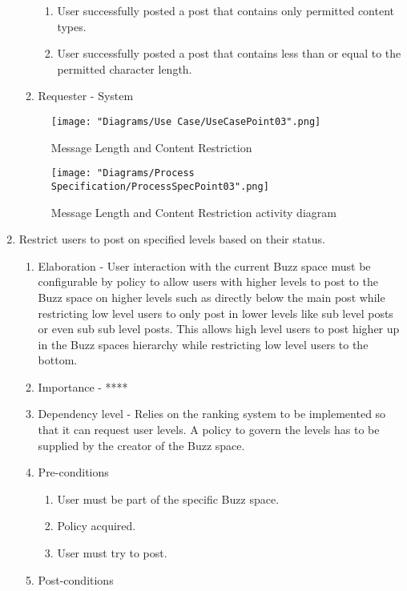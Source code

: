 \documentclass[12pt]{article}
\begin{document}
\begin{enumerate}
\begin{enumerate}
    \begin{enumerate}
    	\item User successfully posted a post that contains only permitted content types.
    	\item User successfully posted a post that contains less than or equal to the permitted character length.
    \end{enumerate}
    \item Requester - System
  \end{enumerate}
\begin{figure}[h]
  	\centering
  	\texttt{[image: "Diagrams/Use Case/UseCasePoint03".png]}
  	\caption{Message Length and Content Restriction}
  \end{figure}
  \begin{figure}[h]
  		\centering
  		\texttt{[image: "Diagrams/Process Specification/ProcessSpecPoint03".png]}
  		\caption{Message Length and Content Restriction activity diagram}
  	\end{figure}
\clearpage %
   \item Restrict users to post on specified levels based on their status. %
  \begin{enumerate}
    \item Elaboration - User interaction with the current Buzz space must be configurable by policy to allow users with higher levels to post to the Buzz space on higher levels such as directly below the main post while restricting low level users to only post in lower levels like sub level posts or even sub sub level posts. This allows high level users to post higher up in the Buzz spaces hierarchy while restricting low level users to the bottom. 
    \item Importance - ****
    \item Dependency level - Relies on the ranking system to be implemented so that it can request user levels. A policy to govern the levels has to be supplied by the creator of the Buzz space.
    \item Pre-conditions
    \begin{enumerate}
    	\item User must be part of the specific Buzz space.
    	\item Policy acquired.
    	\item User must try to post.
    \end{enumerate}
        \item Post-conditions

\end{enumerate}
\end{enumerate}
\end{document}
